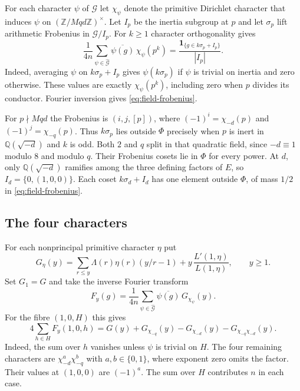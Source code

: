 For each character $\psi$ of $\mathcal G$ let $\chi_\psi$ denote the
primitive Dirichlet character that induces $\psi$ on
$(\mathbb Z/Mqd\mathbb Z)^\times$. Let $I_p$ be the inertia subgroup
at $p$ and let $\sigma_p$ lift arithmetic Frobenius in
$\mathcal G/I_p$. For $k\ge1$ character orthogonality gives
\begin{equation}\label{eq:field-frobenius}
  \frac{1}{4n}\sum_{\psi\in\widehat{\mathcal G}}
       \overline{\psi(g)}\,\chi_\psi(p^k)
  =\frac{\mathbf 1_{\{g\in k\sigma_p+I_p\}}}{|I_p|}.
\end{equation}
Indeed, averaging $\psi$ on $k\sigma_p+I_p$ gives $\psi(k\sigma_p)$
if $\psi$ is trivial on inertia and zero otherwise. These values are
exactly $\chi_\psi(p^k)$, including zero when $p$ divides its conductor.
Fourier inversion gives \eqref{eq:field-frobenius}.

For $p\nmid Mqd$ the Frobenius is $(i,j,[p])$, where
$(-1)^i=\chi_{-d}(p)$ and $(-1)^j=\chi_{-q}(p)$.
Thus $k\sigma_p$ lies outside $\Phi$ precisely when $p$ is inert in
$\mathbb Q(\sqrt{-d})$ and $k$ is odd. Both $2$ and $q$ split in that
quadratic field, since $-d\equiv1$ modulo $8$ and modulo $q$.
Their Frobenius cosets lie in $\Phi$ for every power. At $d$, only
$\mathbb Q(\sqrt{-d})$ ramifies among the three defining factors of
$E$, so $I_d=\{0,(1,0,0)\}$. Each coset $k\sigma_d+I_d$ has one
element outside $\Phi$, of mass $1/2$ in \eqref{eq:field-frobenius}.

\subsection{The four characters}

For each nonprincipal primitive character $\eta$ put
\[
  G_\eta(y)=\sum_{r\le y}\Lambda(r)\eta(r)(y/r-1)
               +y\,\frac{L'(1,\eta)}{L(1,\eta)},\qquad y\ge1.
\]
Set $G_1=G$ and take the inverse Fourier transform
\[
  F_y(g)=\frac{1}{4n}\sum_{\psi\in\widehat{\mathcal G}}
                   \overline{\psi(g)}\,G_{\chi_\psi}(y).
\]
For the fibre $(1,0,H)$ this gives
\begin{equation}\label{eq:field-projection}
  4\sum_{h\in H} F_y(1,0,h)
   =G(y)+G_{\chi_{-q}}(y)-G_{\chi_{-d}}(y)
      -G_{\chi_{-q}\chi_{-d}}(y).
\end{equation}
Indeed, the sum over $h$ vanishes unless $\psi$ is trivial on $H$.
The four remaining characters are $\chi_{-d}^a\chi_{-q}^b$ with
$a,b\in\{0,1\}$, where exponent zero omits the factor. Their values at
$(1,0,0)$ are $(-1)^a$. The sum over $H$ contributes $n$ in each case.

